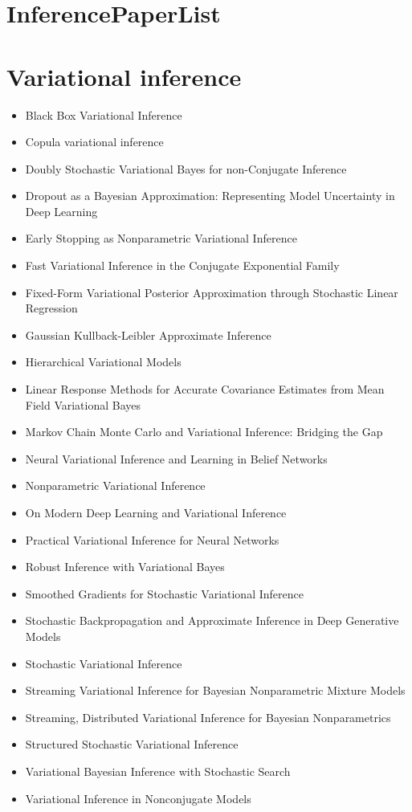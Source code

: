 \documentclass[11pt]{article}
\author{Ubuntu}
\date{\today}
\title{}
\begin{document}
\tableofcontents

\section{InferencePaperList}
\label{sec:orgheadline1}

\section{Variational inference}
\label{sec:orgheadline2}

\begin{itemize}
\item Black Box Variational Inference
\item Copula variational inference
\item Doubly Stochastic Variational Bayes for non-Conjugate Inference
\item Dropout as a Bayesian Approximation: Representing Model Uncertainty in Deep Learning
\item Early Stopping as Nonparametric Variational Inference
\item Fast Variational Inference in the Conjugate Exponential Family
\item Fixed-Form Variational Posterior Approximation through Stochastic Linear Regression
\item Gaussian Kullback-Leibler Approximate Inference
\item Hierarchical Variational Models
\item Linear Response Methods for Accurate Covariance Estimates from Mean Field Variational Bayes
\item Markov Chain Monte Carlo and Variational Inference: Bridging the Gap
\item Neural Variational Inference and Learning in Belief Networks
\item Nonparametric Variational Inference
\item On Modern Deep Learning and Variational Inference
\item Practical Variational Inference for Neural Networks
\item Robust Inference with Variational Bayes
\item Smoothed Gradients for Stochastic Variational Inference
\item Stochastic Backpropagation and Approximate Inference in Deep Generative Models
\item Stochastic Variational Inference
\item Streaming Variational Inference for Bayesian Nonparametric Mixture Models
\item Streaming, Distributed Variational Inference for Bayesian Nonparametrics
\item Structured Stochastic Variational Inference
\item Variational Bayesian Inference with Stochastic Search
\item Variational Inference in Nonconjugate Models
\end{itemize}
\end{document}
